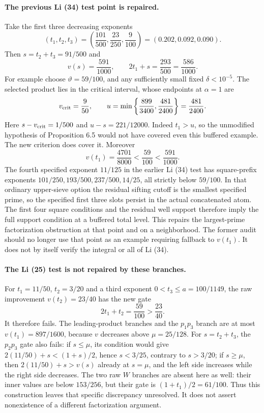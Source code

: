 \documentclass[11pt]{article}
\begin{document}
\paragraph{The previous Li (34) test point is repaired.}
Take the first three decreasing exponents
\[
 (t_1,t_2,t_3)=\left(\frac{101}{500},\frac{23}{250},\frac9{100}\right)
                  =(0.202,0.092,0.090).
\]
Then $s=t_2+t_3=91/500$ and
\[
 v(s)=\frac{591}{1000},\qquad
 2t_1+s=\frac{293}{500}=\frac{586}{1000}.
\]
For example choose $\vartheta=59/100$, and any sufficiently small
fixed $\delta<10^{-5}$.  The selected product lies in the critical
interval, whose endpoints at $\alpha=1$ are
\[
 v_{\rm crit}=\frac9{50},\qquad
 u=\min\left\{\frac{899}{3400},\frac{481}{2400}\right\}
   =\frac{481}{2400}.
\]
Here $s-v_{\rm crit}=1/500$ and $u-s=221/12000$.
Indeed $t_1>u$, so the unmodified hypothesis of Proposition 6.5
would not have covered even this buffered example.
The new criterion does cover it.  Moreover
\[
 v(t_1)=\frac{4701}{8000}<\frac{59}{100}<\frac{591}{1000}.
\]
The fourth specified exponent $11/125$ in the earlier Li (34)
test has square-prefix exponents $101/250,193/500,237/500,14/25$,
all strictly below $59/100$.  In that ordinary upper-sieve option
the residual sifting cutoff is the smallest specified prime, so the
specified first three slots persist in the actual concatenated atom.
The first four square conditions and the residual well support
therefore imply the full support condition at a buffered total level.
This repairs the largest-prime factorization obstruction at that
point and on a neighborhood.  The former audit should no longer
use that point as an example requiring fallback to $v(t_1)$.
It does not by itself verify the integral or all of Li (34).

\paragraph{The Li (25) test is not repaired by these branches.}
For $t_1=11/50$, $t_2=3/20$ and a third exponent
$0<t_3\le a=100/1149$, the raw improvement $v(t_2)=23/40$
has the new gate
\[
 2t_1+t_2=\frac{59}{100}>\frac{23}{40}.
\]
It therefore fails.  The leading-product branches and the $p_1p_3$
branch are at most $v(t_1)=897/1600$, because $v$ decreases above
$\mu=25/128$.  For $s=t_2+t_3$, the $p_2p_3$ gate also fails:
if $s\le\mu$, its condition would give
$2(11/50)+s<(1+s)/2$, hence $s<3/25$, contrary to $s>3/20$;
if $s\ge\mu$, then $2(11/50)+s>v(s)$ already at $s=\mu$,
and the left side increases while the right side decreases.
The two raw $W$ branches are absent here as well: their inner values
are below $153/256$, but their gate is $(1+t_1)/2=61/100$.
Thus this construction leaves that specific discrepancy unresolved.
It does not assert nonexistence of a different factorization argument.
\end{document}
